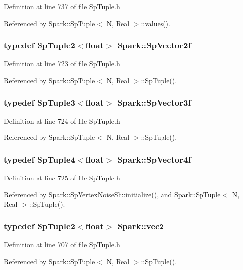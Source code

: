 Definition at line 737 of file Sp\-Tuple.h.

Referenced by Spark::Sp\-Tuple$<$ N, Real $>$::values().
\subsubsection{\setlength{\rightskip}{0pt plus 5cm}typedef Sp\-Tuple2$<$float$>$ {\bf Spark::Sp\-Vector2f}}\label{namespaceSpark_a19}


Definition at line 723 of file Sp\-Tuple.h.

Referenced by Spark::Sp\-Tuple$<$ N, Real $>$::Sp\-Tuple().
\subsubsection{\setlength{\rightskip}{0pt plus 5cm}typedef Sp\-Tuple3$<$float$>$ {\bf Spark::Sp\-Vector3f}}\label{namespaceSpark_a20}


Definition at line 724 of file Sp\-Tuple.h.

Referenced by Spark::Sp\-Tuple$<$ N, Real $>$::Sp\-Tuple().
\subsubsection{\setlength{\rightskip}{0pt plus 5cm}typedef Sp\-Tuple4$<$float$>$ {\bf Spark::Sp\-Vector4f}}\label{namespaceSpark_a21}


Definition at line 725 of file Sp\-Tuple.h.

Referenced by Spark::Sp\-Vertex\-Noise\-Sb::initialize(), and Spark::Sp\-Tuple$<$ N, Real $>$::Sp\-Tuple().
\subsubsection{\setlength{\rightskip}{0pt plus 5cm}typedef Sp\-Tuple2$<$float$>$ {\bf Spark::vec2}}\label{namespaceSpark_a7}


Definition at line 707 of file Sp\-Tuple.h.

Referenced by Spark::Sp\-Tuple$<$ N, Real $>$::Sp\-Tuple().
